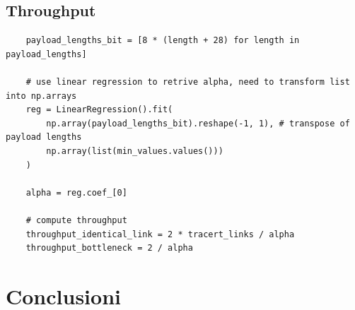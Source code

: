 \vspace{15px}\subsection{Throughput}

\begin{lstlisting}
    payload_lengths_bit = [8 * (length + 28) for length in payload_lengths]

    # use linear regression to retrive alpha, need to transform list into np.arrays
    reg = LinearRegression().fit(
        np.array(payload_lengths_bit).reshape(-1, 1), # transpose of payload lengths
        np.array(list(min_values.values())) 
    )

    alpha = reg.coef_[0]

    # compute throughput
    throughput_identical_link = 2 * tracert_links / alpha
    throughput_bottleneck = 2 / alpha
\end{lstlisting}





\vspace{35px}\section{Conclusioni}




